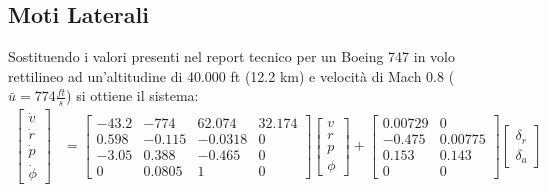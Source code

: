 \subsection{Moti Laterali}
Sostituendo i valori presenti nel report tecnico \cite{heffley_handling_qualities} per un Boeing 747 in volo rettilineo ad un'altitudine di 40.000 ft (12.2 km) e velocità di Mach 0.8 ($\bar{u} = 774 \frac{ft}{s}$) si ottiene il sistema:
\begin{equation*}
    \begin{split}
        \begin{bmatrix}
            \dot{v} \\
            \dot{r} \\
            \dot{p} \\
            \dot{\phi}
        \end{bmatrix} & = \begin{bmatrix}
                              -43.2 & -774   & 62.074  & 32.174 \\
                              0.598 & -0.115 & -0.0318 & 0      \\
                              -3.05 & 0.388  & -0.465  & 0      \\
                              0     & 0.0805 & 1       & 0
                          \end{bmatrix} \begin{bmatrix}
                                            v \\
                                            r \\
                                            p \\
                                            \phi
                                        \end{bmatrix} + \begin{bmatrix}
                                                            0.00729 & 0       \\
                                                            -0.475  & 0.00775 \\
                                                            0.153   & 0.143   \\
                                                            0       & 0
                                                        \end{bmatrix} \begin{bmatrix}
                                                                          \delta_r \\
                                                                          \delta_a
                                                                      \end{bmatrix}
    \end{split}
\end{equation*}

